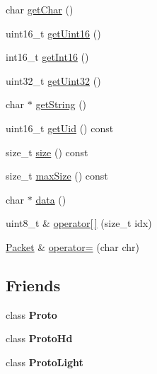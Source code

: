 \begin{DoxyCompactItemize}
char \hyperlink{classTiny_1_1Packet_a260645f9d055da878f149a13ecd58844}{get\+Char} ()
\item 
uint16\+\_\+t \hyperlink{classTiny_1_1Packet_a71765e73adfbc67138f75c2b8ea7d74c}{get\+Uint16} ()
\item 
int16\+\_\+t \hyperlink{classTiny_1_1Packet_a7dfed04418564f93dd4d2b4e9144a861}{get\+Int16} ()
\item 
uint32\+\_\+t \hyperlink{classTiny_1_1Packet_a5dd4b89cb7224b62d4f0328c8e40f38f}{get\+Uint32} ()
\item 
char $\ast$ \hyperlink{classTiny_1_1Packet_a8bc9a3b3f41be292f9c5ac566afeb04b}{get\+String} ()
\item 
uint16\+\_\+t \hyperlink{classTiny_1_1Packet_ae73cb83f0e42b6043479587e4d4371b0}{get\+Uid} () const 
\item 
size\+\_\+t \hyperlink{classTiny_1_1Packet_a2e866d3f461e67281c3af3dd9e93ba0c}{size} () const 
\item 
size\+\_\+t \hyperlink{classTiny_1_1Packet_a59bd34666fb4d872699d36a8d77b90f5}{max\+Size} () const 
\item 
char $\ast$ \hyperlink{classTiny_1_1Packet_a3307ba504caba9c5eee8f1f32cf1a749}{data} ()
\item 
uint8\+\_\+t \& \hyperlink{classTiny_1_1Packet_abfaef504eb88a4db88bca3b907770fa2}{operator\mbox{[}$\,$\mbox{]}} (size\+\_\+t idx)
\item 
\hyperlink{classTiny_1_1Packet}{Packet} \& \hyperlink{classTiny_1_1Packet_a2de2c7f2c3ea6baaab462dd7e4469ecb}{operator=} (char chr)
\end{DoxyCompactItemize}
\subsection*{Friends}
\begin{DoxyCompactItemize}
\item 
\hypertarget{classTiny_1_1Packet_a45bd055fddab40aaf0c60bfb9e21aa6f}{}class {\bfseries Proto}\label{classTiny_1_1Packet_a45bd055fddab40aaf0c60bfb9e21aa6f}

\item 
\hypertarget{classTiny_1_1Packet_a7f90e063a34c3417ed1ea25e64608857}{}class {\bfseries Proto\+Hd}\label{classTiny_1_1Packet_a7f90e063a34c3417ed1ea25e64608857}

\item 
\hypertarget{classTiny_1_1Packet_a1d317236f2a79fa559d5a9112e555882}{}class {\bfseries Proto\+Light}\label{classTiny_1_1Packet_a1d317236f2a79fa559d5a9112e555882}

\end{DoxyCompactItemize}


